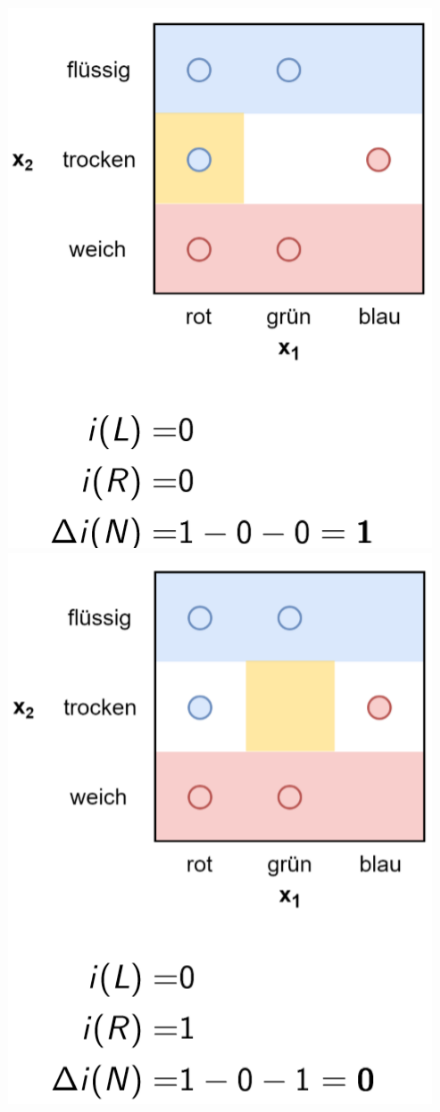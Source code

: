 \documentclass{report}
\begin{document}
  \begin{figure}[H]	
    \centering	
    \begin{minipage}[b]{0.4\textwidth}	
      \includegraphics[scale=.235]{ml07_21}	
    \end{minipage}	
    \begin{minipage}[b]{0.4\textwidth}	
      \includegraphics[scale=.235]{ml07_22}	

\end{minipage}
\end{figure}
\end{document}
